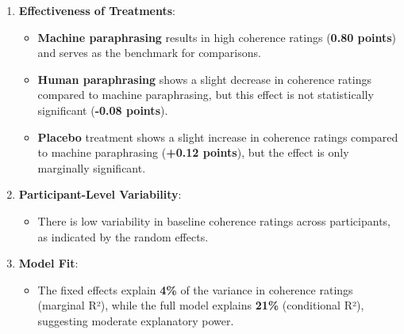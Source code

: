 \documentclass[
]{article}
\providecommand{\tightlist}{%
  \setlength{\itemsep}{0pt}\setlength{\parskip}{0pt}}
\begin{document}
\begin{enumerate}
\def\labelenumi{\arabic{enumi}.}
\tightlist
\item
  \textbf{Effectiveness of Treatments}:

  \begin{itemize}
  \tightlist
  \item
    \textbf{Machine paraphrasing} results in high coherence ratings
    (\textbf{0.80 points}) and serves as the benchmark for comparisons.
  \item
    \textbf{Human paraphrasing} shows a slight decrease in coherence
    ratings compared to machine paraphrasing, but this effect is not
    statistically significant (\textbf{-0.08 points}).
  \item
    \textbf{Placebo} treatment shows a slight increase in coherence
    ratings compared to machine paraphrasing (\textbf{+0.12 points}),
    but the effect is only marginally significant.
  \end{itemize}
\item
  \textbf{Participant-Level Variability}:

  \begin{itemize}
  \tightlist
  \item
    There is low variability in baseline coherence ratings across
    participants, as indicated by the random effects.
  \end{itemize}
\item
  \textbf{Model Fit}:

  \begin{itemize}
  \tightlist
  \item
    The fixed effects explain \textbf{4\%} of the variance in coherence
    ratings (marginal R²), while the full model explains \textbf{21\%}
    (conditional R²), suggesting moderate explanatory power.
  \end{itemize}
\end{enumerate}
\end{document}
